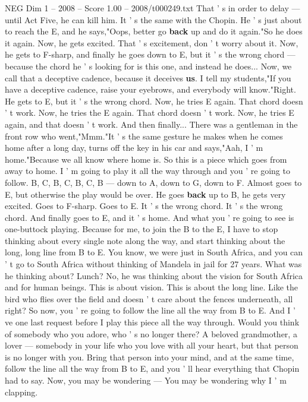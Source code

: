 \begin{textsample}{NEG Dim 1 – 2008 – Score 1.00 – 2008/t000249.txt}
That ' s in order to delay — until Act Five, he can kill him.
It ' s the same with the Chopin.
He ' s just about to reach the E, and he says,"Oops, better go \textbf{back} up and do it again."So he does it again.
Now, he gets excited.
That ' s excitement, don ' t worry about it.
Now, he gets to F-sharp, and finally he goes down to E, but it ' s the wrong chord — because the chord he ' s looking for is this one, and instead he does...
Now, we call that a deceptive cadence, because it deceives \textbf{us}.
I tell my students,"If you have a deceptive cadence, raise your eyebrows, and everybody will know."Right.
He gets to E, but it ' s the wrong chord.
Now, he tries E again.
That chord doesn ' t work.
Now, he tries the E again.
That chord doesn ' t work.
Now, he tries E again, and that doesn ' t work.
And then finally...
There was a gentleman in the front row who went,"Mmm."It ' s the same gesture he makes when he comes home after a long day, turns off the key in his car and says,"Aah, I ' m home."Because we all know where home is.
So this is a piece which goes from away to home.
I ' m going to play it all the way through and you ' re going to follow.
B, C, B, C, B, C, B — down to A, down to G, down to F.
Almost goes to E, but otherwise the play would be over.
He goes \textbf{back} up to B, he gets very excited.
Goes to F-sharp.
Goes to E.
It ' s the wrong chord.
It ' s the wrong chord.
And finally goes to E, and it ' s home.
And what you ' re going to see is one-buttock playing.
Because for me, to join the B to the E, I have to stop thinking about every single note along the way, and start thinking about the long, long line from B to E.
You know, we were just in South Africa, and you can ' t go to South Africa without thinking of Mandela in jail for 27 years.
What was he thinking about?
Lunch?
No, he was thinking about the vision for South Africa and for human beings.
This is about vision.
This is about the long line.
Like the bird who flies over the field and doesn ' t care about the fences underneath, all right?
So now, you ' re going to follow the line all the way from B to E.
And I ' ve one last request before I play this piece all the way through.
Would you think of somebody who you adore, who ' s no longer there?
A beloved grandmother, a lover — somebody in your life who you love with all your heart, but that person is no longer with you.
Bring that person into your mind, and at the same time, follow the line all the way from B to E, and you ' ll hear everything that Chopin had to say.
Now, you may be wondering — You may be wondering why I ' m clapping.

\end{textsample}

